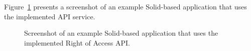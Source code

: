 Figure~\ref{fig:right-app} presents a screenshot of an example Solid-based application that uses the implemented API service.

\begin{figure}[ht]
    \centering
    \caption{Screenshot of an example Solid-based application that uses the implemented Right of Access API.}
    \label{fig:right-app}
\end{figure}

